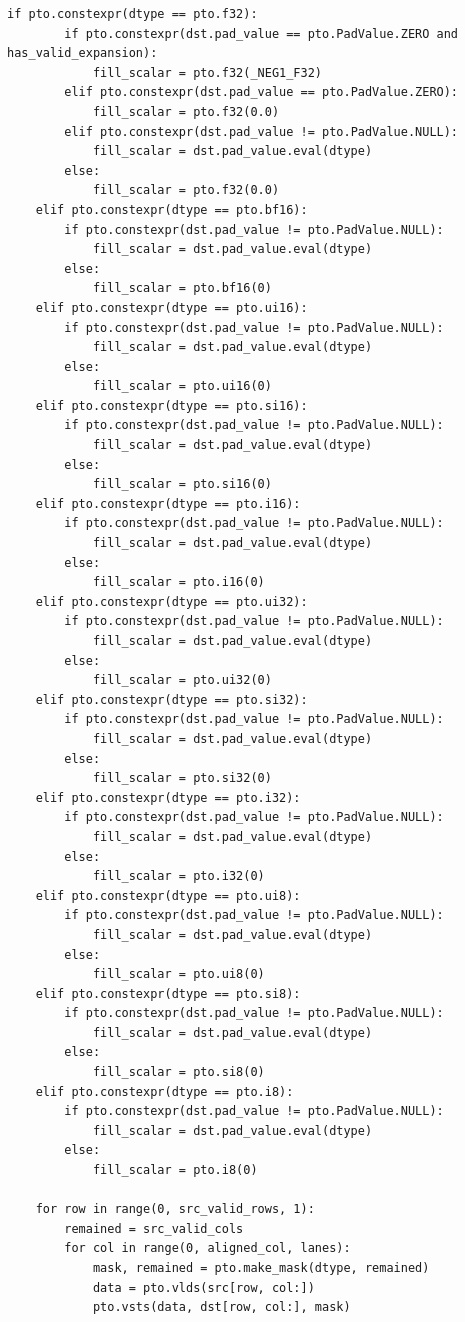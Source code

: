 \begin{lstlisting}[style=ptocode]
    if pto.constexpr(dtype == pto.f32):
        if pto.constexpr(dst.pad_value == pto.PadValue.ZERO and has_valid_expansion):
            fill_scalar = pto.f32(_NEG1_F32)
        elif pto.constexpr(dst.pad_value == pto.PadValue.ZERO):
            fill_scalar = pto.f32(0.0)
        elif pto.constexpr(dst.pad_value != pto.PadValue.NULL):
            fill_scalar = dst.pad_value.eval(dtype)
        else:
            fill_scalar = pto.f32(0.0)
    elif pto.constexpr(dtype == pto.bf16):
        if pto.constexpr(dst.pad_value != pto.PadValue.NULL):
            fill_scalar = dst.pad_value.eval(dtype)
        else:
            fill_scalar = pto.bf16(0)
    elif pto.constexpr(dtype == pto.ui16):
        if pto.constexpr(dst.pad_value != pto.PadValue.NULL):
            fill_scalar = dst.pad_value.eval(dtype)
        else:
            fill_scalar = pto.ui16(0)
    elif pto.constexpr(dtype == pto.si16):
        if pto.constexpr(dst.pad_value != pto.PadValue.NULL):
            fill_scalar = dst.pad_value.eval(dtype)
        else:
            fill_scalar = pto.si16(0)
    elif pto.constexpr(dtype == pto.i16):
        if pto.constexpr(dst.pad_value != pto.PadValue.NULL):
            fill_scalar = dst.pad_value.eval(dtype)
        else:
            fill_scalar = pto.i16(0)
    elif pto.constexpr(dtype == pto.ui32):
        if pto.constexpr(dst.pad_value != pto.PadValue.NULL):
            fill_scalar = dst.pad_value.eval(dtype)
        else:
            fill_scalar = pto.ui32(0)
    elif pto.constexpr(dtype == pto.si32):
        if pto.constexpr(dst.pad_value != pto.PadValue.NULL):
            fill_scalar = dst.pad_value.eval(dtype)
        else:
            fill_scalar = pto.si32(0)
    elif pto.constexpr(dtype == pto.i32):
        if pto.constexpr(dst.pad_value != pto.PadValue.NULL):
            fill_scalar = dst.pad_value.eval(dtype)
        else:
            fill_scalar = pto.i32(0)
    elif pto.constexpr(dtype == pto.ui8):
        if pto.constexpr(dst.pad_value != pto.PadValue.NULL):
            fill_scalar = dst.pad_value.eval(dtype)
        else:
            fill_scalar = pto.ui8(0)
    elif pto.constexpr(dtype == pto.si8):
        if pto.constexpr(dst.pad_value != pto.PadValue.NULL):
            fill_scalar = dst.pad_value.eval(dtype)
        else:
            fill_scalar = pto.si8(0)
    elif pto.constexpr(dtype == pto.i8):
        if pto.constexpr(dst.pad_value != pto.PadValue.NULL):
            fill_scalar = dst.pad_value.eval(dtype)
        else:
            fill_scalar = pto.i8(0)

    for row in range(0, src_valid_rows, 1):
        remained = src_valid_cols
        for col in range(0, aligned_col, lanes):
            mask, remained = pto.make_mask(dtype, remained)
            data = pto.vlds(src[row, col:])
            pto.vsts(data, dst[row, col:], mask)


\end{lstlisting}
